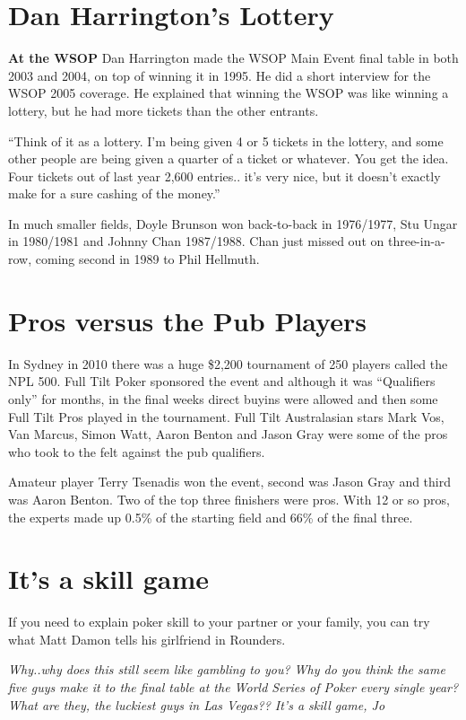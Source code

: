 \section{Dan Harrington's Lottery}

\textbf{At the WSOP} Dan Harrington made the WSOP Main Event final
table in both 2003 and 2004, on top of winning it in 1995. He
did a short interview for the WSOP 2005 coverage. He explained that
winning the WSOP was like winning a lottery, but he had more tickets
than the other entrants.

``Think of it as a lottery. I'm being given 4 or 5 tickets in the
lottery, and some other people are being given a quarter of a ticket
or whatever. You get the idea. Four tickets out of last year 2,600
entries.. it's very nice, but it doesn't exactly make for a sure
cashing of the money.''

In much smaller fields, Doyle Brunson won back-to-back in 1976/1977,
Stu Ungar in 1980/1981 and Johnny Chan 1987/1988. Chan just missed out
on three-in-a-row, coming second in 1989 to Phil Hellmuth.

\section{Pros versus the Pub Players}

In Sydney in 2010 there was a huge \$2,200 tournament of 250 players
called the NPL 500. Full Tilt Poker sponsored the event and although
it was ``Qualifiers only'' for months, in the final weeks direct
buyins were allowed and then some Full Tilt Pros played in the
tournament.  Full Tilt Australasian stars Mark Vos, Van Marcus, Simon
Watt, Aaron Benton and Jason Gray were some of the pros who took to
the felt against the pub qualifiers.

Amateur player Terry Tsenadis won the event, second was Jason Gray and
third was Aaron Benton. Two of the top three finishers were pros. With
12 or so pros, the experts made up 0.5\% of the starting field and
66\% of the final three.

\section{It's a skill game}

If you need to explain poker skill to your partner or your family, you
can try what Matt Damon tells his girlfriend in Rounders.

\textit{Why..why does this still seem like gambling to you? Why do you
  think the same five guys make it to the final table at the World
  Series of Poker every single year? What are they, the luckiest guys
  in Las Vegas?? It's a skill game, Jo}

